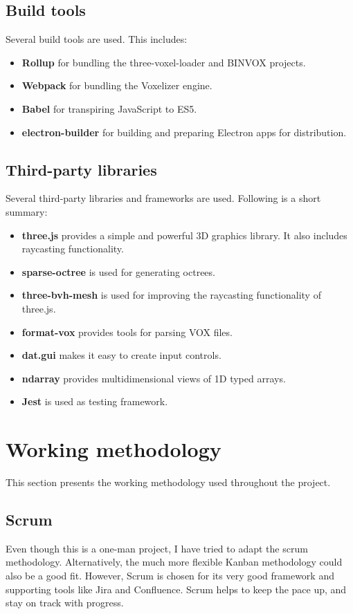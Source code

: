 \subsection{Build tools}
Several build tools are used. This includes:
\begin{itemize}
    \item \textbf{Rollup} for bundling the three-voxel-loader and BINVOX projects.
    \item \textbf{Webpack} for bundling the Voxelizer engine.
    \item \textbf{Babel} for transpiring JavaScript to ES5.
    \item \textbf{electron-builder} for building and preparing Electron apps for distribution.
\end{itemize}

\subsection{Third-party libraries}
Several third-party libraries and frameworks are used. Following is a short summary:
\begin{itemize}
    \item \textbf{three.js} provides a simple and powerful 3D graphics library. It also includes raycasting functionality.
    \item \textbf{sparse-octree} is used for generating octrees.
    \item \textbf{three-bvh-mesh} is used for improving the raycasting functionality of three.js.
    \item \textbf{format-vox} provides tools for parsing VOX files.
    \item \textbf{dat.gui} makes it easy to create input controls.
    \item \textbf{ndarray} provides multidimensional views of 1D typed arrays.
    \item \textbf{Jest} is used as testing framework.
\end{itemize}

\section{Working methodology}
\label{sec:method-working-methodology}
This section presents the working methodology used throughout the project.
\subsection{Scrum}
\label{sec:method-scrum}
Even though this is a one-man project, I have tried to adapt the scrum methodology. Alternatively, the much more flexible Kanban methodology could also be a good fit. However, Scrum is chosen for its very good framework and supporting tools like Jira and Confluence. Scrum helps to keep the pace up, and stay on track with progress.

